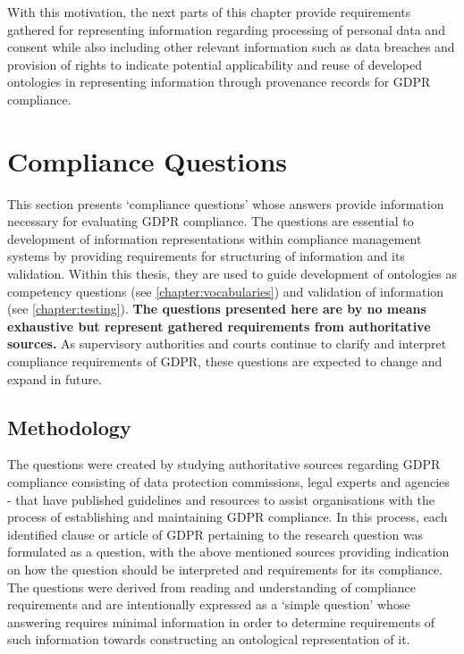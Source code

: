 With this motivation, the next parts of this chapter provide requirements gathered for representing information regarding processing of personal data and consent while also including other relevant information such as data breaches and provision of rights to indicate potential applicability and reuse of developed ontologies in representing information through provenance records for GDPR compliance.

\section{Compliance Questions}\label{sec:info:compliance-questions}
This section presents `compliance questions' whose answers provide information necessary for evaluating GDPR compliance. The questions are essential to development of information representations within compliance management systems by providing requirements for structuring of information and its validation. Within this thesis, they are used to guide development of ontologies as competency questions (see \autoref{chapter:vocabularies}) and validation of information (see \autoref{chapter:testing}). \textbf{The questions presented here are by no means exhaustive but represent gathered requirements from authoritative sources.} As supervisory authorities and courts continue to clarify and interpret compliance requirements of GDPR, these questions are expected to change and expand in future.

\subsection{Methodology}\label{sec:info:compliance-questions-methodology}
The questions were created by studying authoritative sources regarding GDPR compliance consisting of data protection commissions, legal experts and agencies - that have published guidelines and resources to assist organisations with the process of establishing and maintaining GDPR compliance.
In this process, each identified clause or article of GDPR pertaining to the research question was formulated as a question, with the above mentioned sources providing indication on how the question should be interpreted and  requirements for its compliance.
The questions were derived from reading and understanding of compliance requirements and are intentionally expressed as a `simple question' whose answering requires minimal information in order to determine requirements of such information towards constructing an ontological representation of it.


